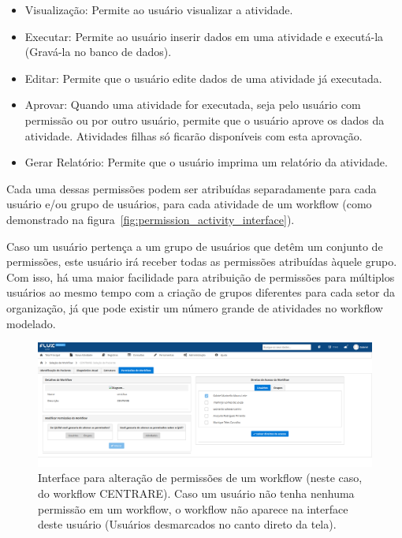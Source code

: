 \begin{itemize}
    \item Visualização: Permite ao usuário visualizar a atividade.
    \item Executar: Permite ao usuário inserir dados em uma atividade e executá-la (Gravá-la no banco de dados).
    \item Editar: Permite que o usuário edite dados de uma atividade já executada.
    \item Aprovar: Quando uma atividade for executada, seja pelo usuário com permissão ou por outro usuário, permite que o usuário aprove os dados da atividade. Atividades filhas só ficarão disponíveis com esta aprovação.
    \item Gerar Relatório: Permite que o usuário imprima um relatório da atividade.
\end{itemize}

Cada uma dessas permissões podem ser atribuídas separadamente para cada usuário e/ou grupo de usuários, para cada atividade de um workflow (como demonstrado na figura~\ref{fig:permission_activity_interface}).

Caso um usuário pertença a um grupo de usuários que detêm um conjunto de permissões, este usuário irá receber todas as permissões atribuídas àquele grupo. Com isso, há uma maior facilidade para atribuição de permissões para múltiplos usuários ao mesmo tempo com a criação de grupos diferentes para cada setor da organização, já que pode existir um número grande de atividades no workflow modelado.

\begin{figure}
    \centering
    \includegraphics[width=\textwidth]{imgs/Flux/Permissoes/telaPermissoesCENTRARE.png}
    \caption{Interface para alteração de permissões de um workflow (neste caso, do workflow CENTRARE). Caso um usuário não tenha nenhuma permissão em um workflow, o workflow não aparece na interface deste usuário (Usuários desmarcados no canto direto da tela).}
    \label{fig:permission_interface}
\end{figure}

